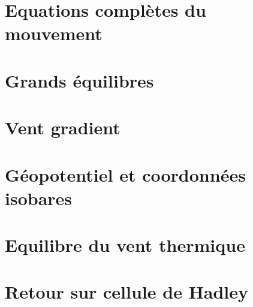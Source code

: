 \documentclass[a4paper,DIV16,10pt]{scrartcl}
\begin{document}
\newpage
\section{Equations complètes du mouvement}


%

%


%	

%	


\section{Grands équilibres}


\newpage
\section{Vent gradient}


\newpage
\section{Géopotentiel et coordonnées isobares}


\newpage
\section{Equilibre du vent thermique}


\newpage
\section{Retour sur cellule de Hadley}

\end{document}
